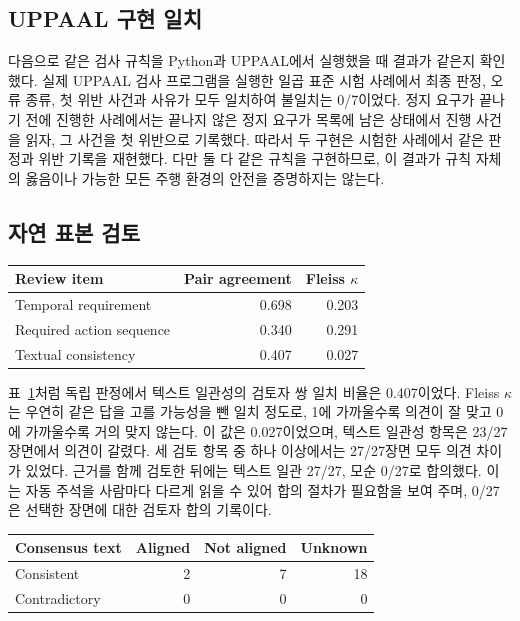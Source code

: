 \subsection{UPPAAL 구현 일치}

다음으로 같은 검사 규칙을 Python과 UPPAAL에서 실행했을 때 결과가 같은지 확인했다. 실제 UPPAAL 검사 프로그램을 실행한 일곱 표준 시험 사례에서 최종 판정, 오류 종류, 첫 위반 사건과 {\unknown} 사유가 모두 일치하여 불일치는 0/7이었다. 정지 요구가 끝나기 전에 진행한 사례에서는 끝나지 않은 정지 요구가 목록에 남은 상태에서 진행 사건을 읽자, 그 사건을 첫 위반으로 기록했다. 따라서 두 구현은 시험한 사례에서 같은 판정과 위반 기록을 재현했다. 다만 둘 다 같은 규칙을 구현하므로, 이 결과가 규칙 자체의 옳음이나 가능한 모든 주행 환경의 안전을 증명하지는 않는다.

\subsection{자연 표본 검토}

\begin{table}[H]
\centering
{}
\label{tab:reviewer-agreement}
\footnotesize
\begin{tabular}{lrr}
\toprule
Review item & Pair agreement & Fleiss $\kappa$ \\
\midrule
Temporal requirement & 0.698 & 0.203 \\
Required action sequence & 0.340 & 0.291 \\
Textual consistency & 0.407 & 0.027 \\
\bottomrule
\end{tabular}
\end{table}

표~\ref{tab:reviewer-agreement}처럼 독립 판정에서 텍스트 일관성의 검토자 쌍 일치 비율은 0.407이었다. Fleiss $\kappa$는 우연히 같은 답을 고를 가능성을 뺀 일치 정도로, 1에 가까울수록 의견이 잘 맞고 0에 가까울수록 거의 맞지 않는다. 이 값은 0.027이었으며, 텍스트 일관성 항목은 23/27장면에서 의견이 갈렸다. 세 검토 항목 중 하나 이상에서는 27/27장면 모두 의견 차이가 있었다. 근거를 함께 검토한 뒤에는 텍스트 일관 27/27, 모순 0/27로 합의했다. 이는 자동 주석을 사람마다 다르게 읽을 수 있어 합의 절차가 필요함을 보여 주며, 0/27은 선택한 장면에 대한 검토자 합의 기록이다.

\begin{table}[H]
\centering
{}
\label{tab:logic-trajectory-cross}
\footnotesize
\begin{tabular}{lrrr}
\toprule
Consensus text & Aligned & Not aligned & Unknown \\
\midrule
Consistent & 2 & 7 & 18 \\
Contradictory & 0 & 0 & 0 \\
\bottomrule
\end{tabular}
\end{table}

